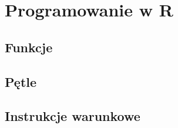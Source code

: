 \documentclass[]{book}
\begin{document}
\chapter{Programowanie w R}\label{programowanie-w-r}

\section{Funkcje}\label{funkcje}

\section{Pętle}\label{petle}

\section{Instrukcje warunkowe}\label{instrukcje-warunkowe}
\end{document}
